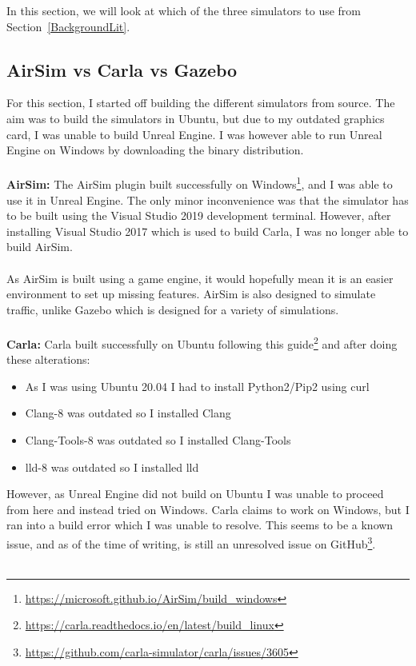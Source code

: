 In this section, we will look at which of the three simulators to use from Section~\ref{BackgroundLit}.%

\subsection{AirSim vs Carla vs Gazebo}
For this section, I started off building the different simulators from source. The aim was to build the simulators in Ubuntu, but due to my outdated graphics card, I was unable to build Unreal Engine. I was however able to run Unreal Engine on Windows by downloading the binary distribution. 
\\~\\
\textbf{AirSim:} The AirSim plugin built successfully on Windows\footnote{\url{https://microsoft.github.io/AirSim/build_windows}}, and I was able to use it in Unreal Engine. The only minor inconvenience was that the simulator has to be built using the Visual Studio 2019 development terminal. However, after installing Visual Studio 2017 which is used to build Carla, I was no longer able to build AirSim. 
\\~\\
As AirSim is built using a game engine, it would hopefully mean it is an easier environment to set up missing features. AirSim is also designed to simulate traffic, unlike Gazebo which is designed for a variety of simulations. 
\\~\\
\textbf{Carla:} Carla built successfully on Ubuntu following this guide\footnote{\url{https://carla.readthedocs.io/en/latest/build_linux}} and after doing these alterations:
\begin{itemize}
    \item As I was using Ubuntu 20.04 I had to install Python2/Pip2 using curl
\item Clang-8 was outdated so I installed Clang
\item Clang-Tools-8 was outdated so I installed Clang-Tools
\item lld-8 was outdated so I installed lld
\end{itemize}
However, as Unreal Engine did not build on Ubuntu I was unable to proceed from here and instead tried on Windows. Carla claims to work on Windows, but I ran into a build error which I was unable to resolve. This seems to be a known issue, and as of the time of writing, is still an unresolved issue on GitHub\footnote{\url{https://github.com/carla-simulator/carla/issues/3605}}. 
\\~\\
